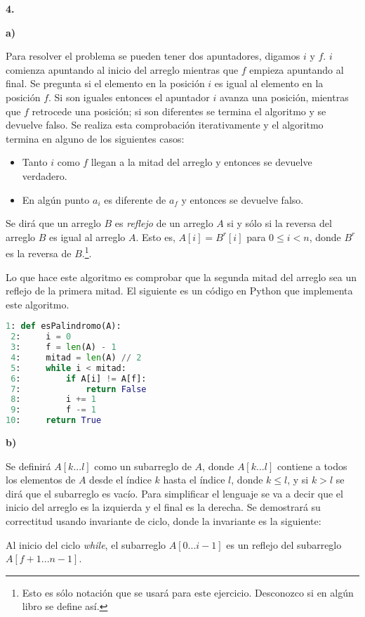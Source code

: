 \documentclass{article}
\begin{document}
\textbf{4.}

\textbf{a)}

Para resolver el problema se pueden tener dos apuntadores, digamos $i$ y $f$. $i$ comienza apuntando al inicio del arreglo mientras que $f$ empieza apuntando al final. Se pregunta si el elemento en la posición $i$ es igual al elemento en la posición $f$. Si son iguales entonces el apuntador $i$ avanza una posición, mientras que $f$ retrocede una posición; si son diferentes se termina el algoritmo y se devuelve falso. Se realiza esta comprobación iterativamente y el algoritmo termina en alguno de los siguientes casos:

\begin{itemize}
\item Tanto $i$ como $f$ llegan a la mitad del arreglo y entonces se devuelve verdadero.
\item En algún punto $a_i$ es diferente de $a_f$ y entonces se devuelve falso.
\end{itemize}

Se dirá que un arreglo $B$ es \textit{reflejo} de un arreglo $A$ si y sólo si la reversa del arreglo $B$ es igual al arreglo $A$. Esto es, $A[i] = B^r[i]$ para $0 \leq i < n$, donde $B^r$ es la reversa de $B$.\footnote{Esto es sólo notación que se usará para este ejercicio. Desconozco si en algún libro se define así.}.

Lo que hace este algoritmo es comprobar que la segunda mitad del arreglo sea un reflejo de la primera mitad. El siguiente es un código en Python que implementa este algoritmo.

\begin{lstlisting}[language=Python]
 1: def esPalindromo(A):
 2:     i = 0
 3:     f = len(A) - 1
 4:     mitad = len(A) // 2
 5:     while i < mitad:
 6:         if A[i] != A[f]:
 7:             return False
 8:         i += 1
 9:         f -= 1
10:     return True
\end{lstlisting}

\textbf{b)}

Se definirá $A[k...l]$ como un subarreglo de $A$, donde $A[k...l]$ contiene a todos los elementos de $A$ desde el índice $k$ hasta el índice $l$, donde $k \leq l$, y si $k > l$ se dirá que el subarreglo es vacío. Para simplificar el lenguaje se va a decir que el inicio del arreglo es la izquierda y el final es la derecha. Se demostrará su correctitud usando invariante de ciclo, donde la invariante es la siguiente:

Al inicio del ciclo \textit{while}, el subarreglo $A[0 ... i-1]$ es un reflejo del subarreglo $A[f+1 ... n-1]$.
\end{document}

